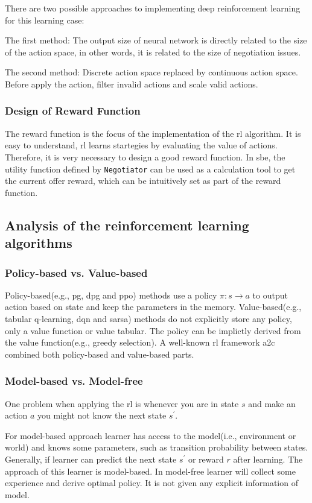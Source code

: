 There are two possible approaches to implementing deep reinforcement learning for this learning case:

The first method: The output size of neural network is directly related to the size of the action space, in other words, it is related to the size of negotiation issues. 

The second method: Discrete action space replaced by continuous action space. Before apply the action, filter invalid actions and scale valid actions.

\subsubsection{Design of Reward Function}
The reward function is the focus of the implementation of the \gls{rl} algorithm. It is easy to understand, \gls{rl} learns startegies by evaluating the value of actions. Therefore, it is very necessary to design a good reward function. In \gls{sbe}, the utility function defined by \texttt{Negotiator} can be used as a calculation tool to get the current offer reward, which can be intuitively set as part of the reward function.  

\subsection{Analysis of the reinforcement learning algorithms}
\subsubsection{Policy-based vs. Value-based}
Policy-based(e.g., \gls{pg}, \gls{dpg} and \gls{ppo}) methods use a policy $\pi:s \to a$ to output action based on state and keep the parameters in the memory. Value-based(e.g., tabular q-learning, \gls{dqn} and \gls{sarsa}) methods do not explicitly store any policy, only a value function or value tabular. The policy can be implictly derived from the value function(e.g., greedy selection). A well-known \gls{rl} framework a2c combined both policy-based and value-based parts.

\subsubsection{Model-based vs. Model-free}
One problem when applying the \gls{rl} is whenever you are in state $s$ and make an action $a$ you might not know the next state $s^{\prime}$.

For model-based approach learner has access to the model(i.e., environment or world) and knows some parameters, such as transition probability between states. Generally, if learner can predict the next state $s^{\prime}$ or reward $r$ after learning. The approach of this learner is model-based. In model-free learner will collect some experience and derive optimal policy. It is not given any explicit information of model.

